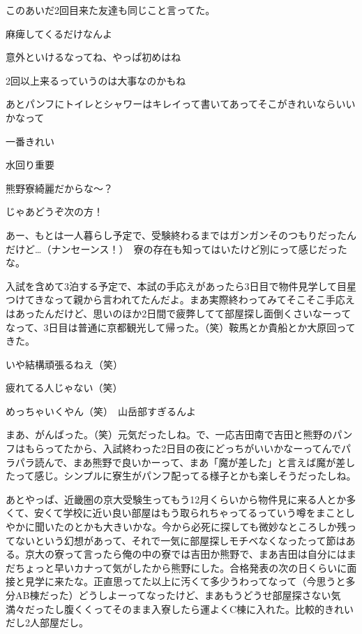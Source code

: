 \begin{multicols}{2}
  このあいだ2回目来た友達も同じこと言ってた。

  麻痺してくるだけなんよ

  意外といけるなってね、やっぱ初めはね

  2回以上来るっていうのは大事なのかもね

  あとパンフにトイレとシャワーはキレイって書いてあってそこがきれいならいいかなって

  一番きれい

  水回り重要

  熊野寮綺麗だからな～？

  じゃあどうぞ次の方！

  あー、もとは一人暮らし予定で、受験終わるまではガンガンそのつもりだったんだけど…（ナンセーンス！）　寮の存在も知ってはいたけど別にって感じだったな。

  入試を含めて3泊する予定で、本試の手応えがあったら3日目で物件見学して目星つけてきなって親から言われてたんだよ。まあ実際終わってみてそこそこ手応えはあったんだけど、思いのほか2日間で疲弊してて部屋探し面倒くさいなーってなって、3日目は普通に京都観光して帰った。（笑）鞍馬とか貴船とか大原回ってきた。

  いや結構頑張るねえ（笑）

  疲れてる人じゃない（笑）

  めっちゃいくやん（笑）　山岳部すぎるんよ

  まあ、がんばった。（笑）元気だったしね。で、一応吉田南で吉田と熊野のパンフはもらってたから、入試終わった2日目の夜にどっちがいいかなーってんでパラパラ読んで、まあ熊野で良いかーって、まあ「魔が差した」と言えば魔が差したって感じ。シンプルに寮生がパンフ配ってる様子とかも楽しそうだったしね。

  あとやっぱ、近畿圏の京大受験生ってもう12月くらいから物件見に来る人とか多くて、安くて学校に近い良い部屋はもう取られちゃってるっていう噂をまことしやかに聞いたのとかも大きいかな。今から必死に探しても微妙なところしか残ってないという幻想があって、それで一気に部屋探しモチベなくなったって節はある。京大の寮って言ったら俺の中の寮では吉田か熊野で、まあ吉田は自分にはまだちょっと早いカナって気がしたから熊野にした。合格発表の次の日くらいに面接と見学に来たな。正直思ってた以上に汚くて多少うわってなって（今思うと多分AB棟だった）どうしよーってなったけど、まあもうどうせ部屋探さない気満々だったし腹くくってそのまま入寮したら運よくC棟に入れた。比較的きれいだし2人部屋だし。


\end{multicols}
